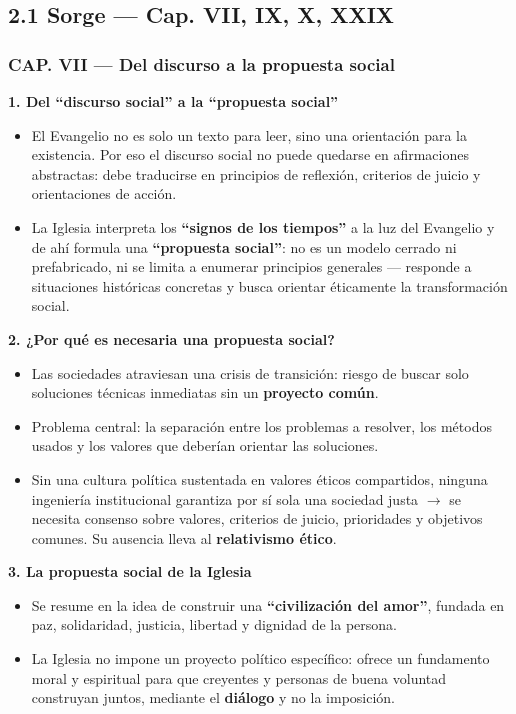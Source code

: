 \documentclass[10pt,a4paper]{article}
\begin{document}
\subsection{2.1 Sorge --- Cap. VII, IX, X, XXIX}

\subsubsection{CAP. VII --- Del discurso a la propuesta social}

\medskip\noindent \textbf{1. Del ``discurso social'' a la ``propuesta social''}\par\nopagebreak
\begin{itemize}
\item El Evangelio no es solo un texto para leer, sino una orientación para la existencia. Por eso el discurso social no puede quedarse en afirmaciones abstractas: debe traducirse en principios de reflexión, criterios de juicio y orientaciones de acción.
\item La Iglesia interpreta los \textbf{``signos de los tiempos''} a la luz del Evangelio y de ahí formula una \textbf{``propuesta social''}: no es un modelo cerrado ni prefabricado, ni se limita a enumerar principios generales --- responde a situaciones históricas concretas y busca orientar éticamente la transformación social.
\end{itemize}

\medskip\noindent \textbf{2. ¿Por qué es necesaria una propuesta social?}\par\nopagebreak
\begin{itemize}
\item Las sociedades atraviesan una crisis de transición: riesgo de buscar solo soluciones técnicas inmediatas sin un \textbf{proyecto común}.
\item Problema central: la separación entre los problemas a resolver, los métodos usados y los valores que deberían orientar las soluciones.
\item Sin una cultura política sustentada en valores éticos compartidos, ninguna ingeniería institucional garantiza por sí sola una sociedad justa $\rightarrow$ se necesita consenso sobre valores, criterios de juicio, prioridades y objetivos comunes. Su ausencia lleva al \textbf{relativismo ético}.
\end{itemize}

\medskip\noindent \textbf{3. La propuesta social de la Iglesia}\par\nopagebreak
\begin{itemize}
\item Se resume en la idea de construir una \textbf{``civilización del amor''}, fundada en paz, solidaridad, justicia, libertad y dignidad de la persona.
\item La Iglesia no impone un proyecto político específico: ofrece un fundamento moral y espiritual para que creyentes y personas de buena voluntad construyan juntos, mediante el \textbf{diálogo} y no la imposición.
\end{itemize}
\end{document}
